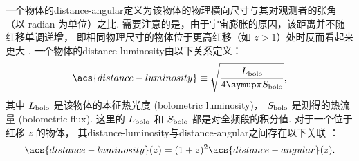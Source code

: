一个物体的\acf{distance-angular}定义为该物体的物理横向尺寸与其对观测者的张角
（以 \si{radian} 为单位）之比.
需要注意的是，由于宇宙膨胀的原因，该距离并不随红移单调递增，
即相同物理尺寸的物体位于更高红移（如 $z > 1$）处时反而看起来更大 \cite{hogg1999}.
一个物体的\acf{distance-luminosity}由以下关系定义：
\begin{equation}
  \label{eq:dl-def}
  \acs{distance-luminosity} \equiv
    \sqrt{\frac{L_{\R{bolo}}}{4\Cpi S_{\R{bolo}}}} ,
\end{equation}
其中 $L_{\mathrm{bolo}}$ 是该物体的本征热光度 (bolometric luminosity)，
$S_{\mathrm{bolo}}$ 是测得的热流量 (bolometric flux).
这里的 $L_{\mathrm{bolo}}$ 和 $S_{\mathrm{bolo}}$ 都是对全频段的积分值.
对于一个位于红移 $z$ 的物体，
其\acl{distance-luminosity}与\acl{distance-angular}之间存在以下关联
\cite{weinberg1972,hogg1999,ellis2007}：
\begin{equation}
  \label{eq:dl-da}
  \acs{distance-luminosity}(z) = (1+z)^2 \acs{distance-angular}(z) .
\end{equation}



